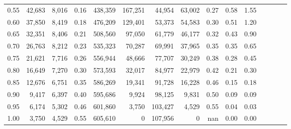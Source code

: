 \begin{tabular}{rrrcrrrrrrrrrrr}
0.55 &  42,683 &  8,016 &                                       0.16 &  438,359 &  167,251 &   44,954 &   63,002 &  0.27 &  0.58 &                         1.55 \\
0.60 &  37,850 &  8,419 &                                       0.18 &  476,209 &  129,401 &   53,373 &   54,583 &  0.30 &  0.51 &                         1.20 \\
0.65 &  32,351 &  8,406 &                                       0.21 &  508,560 &   97,050 &   61,779 &   46,177 &  0.32 &  0.43 &                         0.90 \\
0.70 &  26,763 &  8,212 &                                       0.23 &  535,323 &   70,287 &   69,991 &   37,965 &  0.35 &  0.35 &                         0.65 \\
0.75 &  21,621 &  7,716 &                                       0.26 &  556,944 &   48,666 &   77,707 &   30,249 &  0.38 &  0.28 &                         0.45 \\
0.80 &  16,649 &  7,270 &                                       0.30 &  573,593 &   32,017 &   84,977 &   22,979 &  0.42 &  0.21 &                         0.30 \\
0.85 &  12,676 &  6,751 &                                       0.35 &  586,269 &   19,341 &   91,728 &   16,228 &  0.46 &  0.15 &                         0.18 \\
0.90 &   9,417 &  6,397 &                                       0.40 &  595,686 &    9,924 &   98,125 &    9,831 &  0.50 &  0.09 &                         0.09 \\
0.95 &   6,174 &  5,302 &                                       0.46 &  601,860 &    3,750 &  103,427 &    4,529 &  0.55 &  0.04 &                         0.03 \\
1.00 &   3,750 &  4,529 &                                       0.55 &  605,610 &        0 &  107,956 &        0 &   nan &  0.00 &                         0.00 \\
\bottomrule
\end{tabular}
